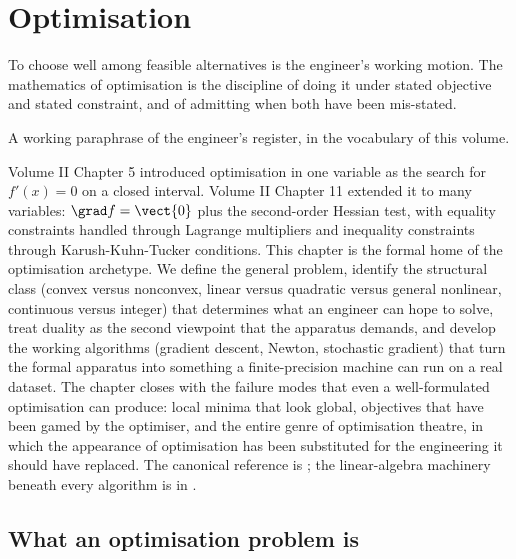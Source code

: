 \chapter{Optimisation}
\label{vol02:ch15}

\epigraph{To choose well among feasible alternatives is the
engineer's working motion. The mathematics of optimisation is the
discipline of doing it under stated objective and stated
constraint, and of admitting when both have been mis-stated.}{A
working paraphrase of the engineer's register, in the vocabulary
of this volume.}


\noindent
Volume II Chapter 5 introduced optimisation in one variable as
the search for $f'(x) = 0$ on a closed interval. Volume II
Chapter 11 extended it to many variables: $\grad f = \vect{0}$
plus the second-order Hessian test, with equality constraints
handled through Lagrange multipliers and inequality constraints
through Karush-Kuhn-Tucker conditions. This chapter is the
formal home of the optimisation archetype. We define the general
problem, identify the structural class (convex versus nonconvex,
linear versus quadratic versus general nonlinear, continuous
versus integer) that determines what an engineer can hope to
solve, treat duality as the second viewpoint that the apparatus
demands, and develop the working algorithms (gradient descent,
Newton, stochastic gradient) that turn the formal apparatus into
something a finite-precision machine can run on a real dataset.
The chapter closes with the failure modes that even a
well-formulated optimisation can produce: local minima that
look global, objectives that have been gamed by the optimiser,
and the entire genre of optimisation theatre, in which the
appearance of optimisation has been substituted for the
engineering it should have replaced. The canonical reference is
\textcite{text:boyd-vandenberghe2004}; the linear-algebra
machinery beneath every algorithm is in
\textcite{text:strang2016}.

\section{What an optimisation problem is}


